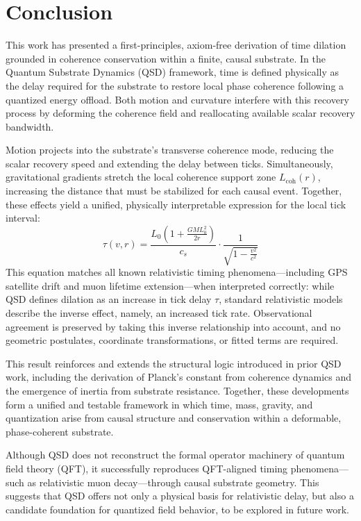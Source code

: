 \documentclass[entropy,article,submit,pdftex,moreauthors]{Definitions/mdpi}
\begin{document}
\section{Conclusion}

This work has presented a first-principles, axiom-free derivation of time dilation grounded in coherence conservation within a finite, causal substrate. In the Quantum Substrate Dynamics (QSD) framework, time is defined physically as the delay required for the substrate to restore local phase coherence following a quantized energy offload. Both motion and curvature interfere with this recovery process by deforming the coherence field and reallocating available scalar recovery bandwidth.

Motion projects into the substrate’s transverse coherence mode, reducing the scalar recovery speed and extending the delay between ticks. Simultaneously, gravitational gradients stretch the local coherence support zone \( L_{\text{coh}}(r) \), increasing the distance that must be stabilized for each causal event. Together, these effects yield a unified, physically interpretable expression for the local tick interval:
\[
\tau(v, r) =
\frac{L_0 \left(1 + \frac{GM L_0^2}{2r} \right)}{c_s}
\cdot \frac{1}{\sqrt{1 - \frac{v^2}{c^2}}}
\]
This equation matches all known relativistic timing phenomena—including GPS satellite drift and muon lifetime extension—when interpreted correctly: while QSD defines dilation as an increase in tick delay \( \tau \), standard relativistic models describe the inverse effect, namely, an increased tick rate. Observational agreement is preserved by taking this inverse relationship into account, and no geometric postulates, coordinate transformations, or fitted terms are required.

This result reinforces and extends the structural logic introduced in prior QSD work, including the derivation of Planck’s constant from coherence dynamics and the emergence of inertia from substrate resistance. Together, these developments form a unified and testable framework in which time, mass, gravity, and quantization arise from causal structure and conservation within a deformable, phase-coherent substrate.

Although QSD does not reconstruct the formal operator machinery of quantum field theory (QFT), it successfully reproduces QFT-aligned timing phenomena—such as relativistic muon decay—through causal substrate geometry. This suggests that QSD offers not only a physical basis for relativistic delay, but also a candidate foundation for quantized field behavior, to be explored in future work.
\end{document}
